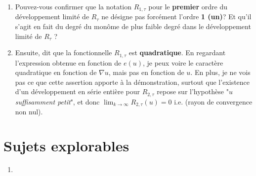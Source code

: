 \documentclass[
  french,
	11pt, %
]{fphw}
\begin{document}
\begin{enumerate}
  \item Pouvez-vous confirmer que la notation $R_{1,\tau}$ pour le \textbf{premier} ordre du développement limité de $R_{\tau}$ ne désigne pas forcément l'ordre \textbf{1 (un)}? Et qu'il s'agit en fait du degré du monôme de plus faible degré dans le développement limité de $R_{\tau}$ ?
  \item Ensuite, \citeauthor{balasoiu2020halthesis} dit que la fonctionnelle $R_{1,\tau}$ est \textbf{quadratique}. En regardant l'expression obtenue en fonction de $e(u)$, je peux voire le caractère quadratique en fonction de $\nabla u$, mais pas en fonction de $u$. En plus, je ne vois pas ce que cette assertion apporte à la démonstration, surtout que l'existence d'un développement en série entière pour $R_{2,\tau}$ repose sur l'hypothèse "\textit{$u$ suffisamment petit}", et donc $\lim_{k \to \infty} R_{2,\tau}(u) = 0$ i.e. (rayon de convergence non nul).
\end{enumerate}


\section{Sujets explorables}

\begin{enumerate}
  \item 
\end{enumerate}

\clearpage   %
\printbibliography
\end{document}
